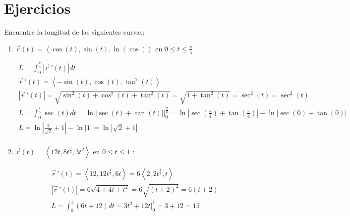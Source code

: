 \section{Ejercicios}
Encuentre la longitud de las siguientes curvas:
\begin{enumerate}
    \item $\vec{r}(t)= \left\langle \cos(t),\sin(t),\ln(\cos) \right\rangle $ en $0 \le t \le \frac{\pi }{4} $
        \begin{center}
            \begin{align*}
                L = \int_{0 }^{\frac{\pi }{4}} \left| \vec{r}\, ' (t) \right| dt \\ 
                \vec{r}\,'(t) = \left\langle -\sin(t),\cos(t),\tan^2(t) \right\rangle \\ 
                \left| \vec{r}\,'(t) \right| = \sqrt{\sin^2(t)+\cos^2(t)+\tan^2(t)} = \sqrt{1+\tan^2(t)} = \sec^2(t) = \sec^2(t) \\ 
                L = \int_{0}^{\frac{\pi }{4}}\sec(t)dt = \ln\left| \sec(t)+\tan(t) \right| \Big|_{0}^{\frac{\pi }{4}} = \ln \left| \sec(\frac{\pi }{4}) + \tan(\frac{\pi }{4} ) \right| -  \ln \left| \sec(0) + \tan(0) \right|\\ 
                L = \ln \left| \frac{2}{\sqrt{2}} + 1  \right|  - \ln \left| 1 \right| = \ln \left| \sqrt{2}+1 \right| \\ 
            \end{align*}
        \end{center}
    
    \item $\vec{r}(t)= \left\langle 12t,8t^{\frac{3}{2}},3t^2 \right\rangle $ en $0 \le t \le 1$ :
        \begin{center}
           \begin{align*}
               \vec{r}\,'(t) = \left\langle 12,12t^{\frac{1}{2}},6t \right\rangle = 6 \left\langle 2,2t^{\frac{1}{2}},t \right\rangle  \\ 
               \left| \vec{r}\,'(t) \right| = 6 \sqrt{4+4t+t^2} = 6 \sqrt{(t+2)^2}= 6(t+2) \\ 
               L = \int_{0}^{1} (6t+12) dt = 3t^2+12t \Big|_{0}^{1} = 3+12 = 15 \\ 
           \end{align*}
        \end{center}
\end{enumerate}









% 
